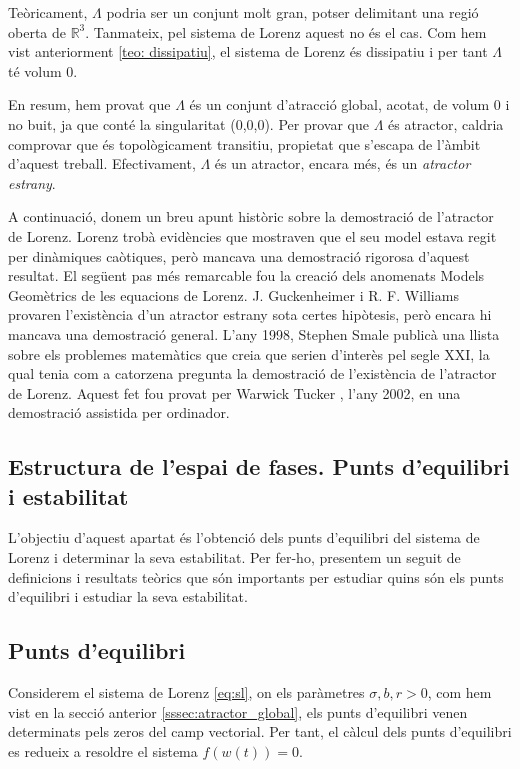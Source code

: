 \documentclass[11pt,a4paper,openright,oneside]{article}
\numberwithin{equation}{section}
\theoremstyle{definition}
\begin{document}
Teòricament, $\Lambda$ podria ser un conjunt molt gran, potser delimitant una regió oberta de $\mathbb{R}^{3}$. Tanmateix, pel sistema de Lorenz aquest no és el cas. Com hem vist anteriorment \eqref{teo: dissipatiu}, el sistema de Lorenz és dissipatiu i per tant $\Lambda$ té volum 0.

En resum, hem provat que $\Lambda$ és un conjunt d'atracció global, acotat, de volum 0 i no buit, ja que conté la singularitat (0,0,0). Per provar que $\Lambda$ és atractor, caldria comprovar que és topològicament transitiu, propietat que s'escapa de l'àmbit d'aquest treball. Efectivament, $\Lambda$ és un atractor, encara més, és un \textit{atractor estrany}.

A continuació, donem un breu apunt històric sobre la demostració de l'atractor de Lorenz. Lorenz \cite{Lorenz} trobà evidències que mostraven que el seu model estava regit per dinàmiques caòtiques, però mancava una demostració rigorosa d'aquest resultat. El següent pas més remarcable fou la creació dels anomenats Models Geomètrics de les equacions de Lorenz. J. Guckenheimer i R. F. Williams \cite{Guckenheimer} provaren l'existència d'un atractor estrany sota certes hipòtesis, però encara hi mancava una demostració general. L'any 1998, Stephen Smale \cite{Smale} publicà una llista sobre els problemes matemàtics que creia que serien d'interès pel segle XXI, la qual tenia com a catorzena pregunta la demostració de l'existència de l'atractor de Lorenz. Aquest fet fou provat per Warwick Tucker \cite{Tucker}, l'any 2002, en una demostració assistida per ordinador.

\subsection{Estructura de l'espai de fases. Punts d'equilibri i estabilitat}\label{sssec:estabilitat}

L'objectiu d'aquest apartat és l'obtenció dels punts d'equilibri del sistema de Lorenz i determinar la seva estabilitat. Per fer-ho, presentem un seguit de definicions i resultats teòrics que són importants per estudiar quins són els punts d'equilibri i estudiar la seva estabilitat.

\subsection*{Punts d'equilibri}
    
Considerem el sistema de Lorenz \eqref{eq:sl}, on els paràmetres $\sigma, b, r>0$, com hem vist en la secció anterior \ref{sssec:atractor_global}, els punts d'equilibri venen determinats pels zeros del camp vectorial. Per tant, el càlcul dels punts d'equilibri es redueix a resoldre el sistema $f\left(w(t)\right)=0$.
\end{document}
